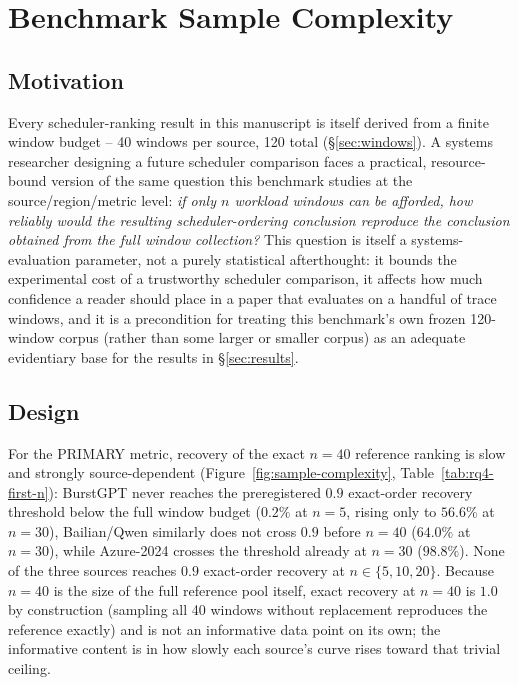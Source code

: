 \documentclass[sn-basic,Numbered,pdflatex]{sn-jnl}
\begin{document}
\section{Benchmark Sample Complexity}
\label{sec:sample-complexity}

\subsection{Motivation}
\label{sec:sample-complexity-motivation}

Every scheduler-ranking result in this manuscript is itself derived from a
finite window budget -- 40 windows per source, 120 total
(\S\ref{sec:windows}). A systems researcher designing a future scheduler
comparison faces a practical, resource-bound version of the same question
this benchmark studies at the source/region/metric level: \emph{if only $n$
workload windows can be afforded, how reliably would the resulting
scheduler-ordering conclusion reproduce the conclusion obtained from the
full window collection?} This question is itself a systems-evaluation
parameter, not a purely statistical afterthought: it bounds the
experimental cost of a trustworthy scheduler comparison, it affects how
much confidence a reader should place in a paper that evaluates on a
handful of trace windows, and it is a precondition for treating this
benchmark's own frozen 120-window corpus (rather than some larger or
smaller corpus) as an adequate evidentiary base for the results in
\S\ref{sec:results}.

\subsection{Design}
\label{sec:sample-complexity-design}

For the PRIMARY metric, recovery of the exact $n=40$ reference ranking is
slow and strongly source-dependent (Figure~\ref{fig:sample-complexity},
Table~\ref{tab:rq4-first-n}): BurstGPT never reaches the preregistered
$0.9$ exact-order recovery threshold below the full window budget ($0.2\%$
at $n=5$, rising only to $56.6\%$ at $n=30$), Bailian/Qwen similarly does
not cross $0.9$ before $n=40$ ($64.0\%$ at $n=30$), while Azure-2024
crosses the threshold already at $n=30$ ($98.8\%$). None of the three
sources reaches $0.9$ exact-order recovery at $n \in \{5,10,20\}$. Because
$n=40$ is the size of the full reference pool itself, exact recovery at
$n=40$ is $1.0$ by construction (sampling all 40 windows without
replacement reproduces the reference exactly) and is not an informative
data point on its own; the informative content is in how slowly each
source's curve rises toward that trivial ceiling.
\end{document}
